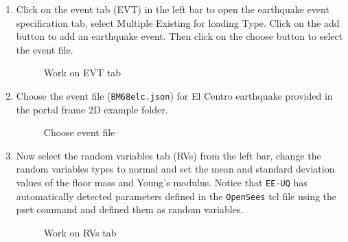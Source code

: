 \begin{enumerate}
\item Click on the event tab (EVT) in the left bar to open the earthquake event specification tab, select Multiple Existing for loading Type. Click on the add button to add an earthquake event. 
Then click on the choose button to select the event file.
\begin{figure}[!htbp]
  \caption{Work on EVT tab}
  \label{fig:figure24}
\end{figure}

\item Choose the event file (\texttt{BM68elc.json}) for El Centro earthquake provided in the portal frame 2D example folder.
\begin{figure}[!htbp]
  \caption{Choose event file}
  \label{fig:figure25}
\end{figure}

\item Now select the random variables tab (RVs) from the left bar, change the random variables types to normal and set the mean and standard deviation values of the floor mass and
Young’s modulus.  Notice that \texttt{EE-UQ} has automatically
detected parameters defined in the \texttt{OpenSees} tcl file using the pset
command and defined them as random variables.
\begin{figure}[!htbp]
  \caption{Work on RVs tab}
  \label{fig:figure26}
\end{figure}


\end{enumerate}

